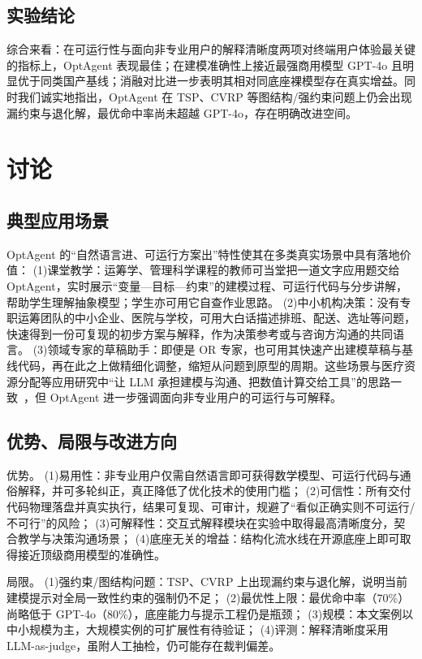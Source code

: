 \documentclass[11pt]{article}
\begin{document}
\subsection{实验结论}
综合来看：在可运行性与面向非专业用户的解释清晰度两项对终端用户体验最关键的指标上，OptAgent 表现最佳；在建模准确性上接近最强商用模型 GPT-4o 且明显优于同类国产基线；消融对比进一步表明其相对同底座裸模型存在真实增益。同时我们诚实地指出，OptAgent 在 TSP、CVRP 等图结构/强约束问题上仍会出现漏约束与退化解，最优命中率尚未超越 GPT-4o，存在明确改进空间。

\section{讨论}\label{sec:discuss}

\subsection{典型应用场景}
OptAgent 的“自然语言进、可运行方案出”特性使其在多类真实场景中具有落地价值：
(1)课堂教学：运筹学、管理科学课程的教师可当堂把一道文字应用题交给 OptAgent，实时展示“变量—目标—约束”的建模过程、可运行代码与分步讲解，帮助学生理解抽象模型；学生亦可用它自查作业思路。
(2)中小机构决策：没有专职运筹团队的中小企业、医院与学校，可用大白话描述排班、配送、选址等问题，快速得到一份可复现的初步方案与解释，作为决策参考或与咨询方沟通的共同语言。
(3)领域专家的草稿助手：即便是 OR 专家，也可用其快速产出建模草稿与基线代码，再在此之上做精细化调整，缩短从问题到原型的周期。这些场景与医疗资源分配等应用研究中“让 LLM 承担建模与沟通、把数值计算交给工具”的思路一致~\cite{wan2025healthcare}，但 OptAgent 进一步强调面向非专业用户的可运行与可解释。

\subsection{优势、局限与改进方向}
优势。
(1)易用性：非专业用户仅需自然语言即可获得数学模型、可运行代码与通俗解释，并可多轮纠正，真正降低了优化技术的使用门槛；
(2)可信性：所有交付代码物理落盘并真实执行，结果可复现、可审计，规避了“看似正确实则不可运行/不可行”的风险；
(3)可解释性：交互式解释模块在实验中取得最高清晰度分，契合教学与决策沟通场景；
(4)底座无关的增益：结构化流水线在开源底座上即可取得接近顶级商用模型的准确性。

局限。
(1)强约束/图结构问题：TSP、CVRP 上出现漏约束与退化解，说明当前建模提示对全局一致性约束的强制仍不足；
(2)最优性上限：最优命中率（70\%）尚略低于 GPT-4o（80\%），底座能力与提示工程仍是瓶颈；
(3)规模：本文案例以中小规模为主，大规模实例的可扩展性有待验证；
(4)评测：解释清晰度采用 LLM-as-judge，虽附人工抽检，仍可能存在裁判偏差。
\end{document}
